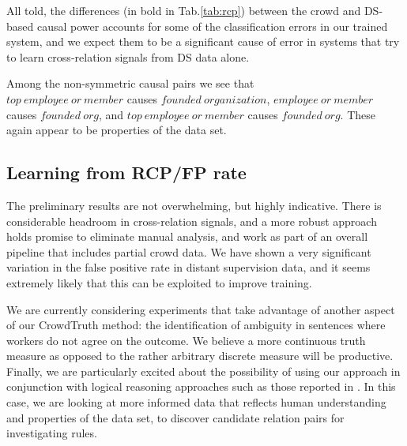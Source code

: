 All told, the differences (in bold in Tab.\ref{tab:rcp}) between the crowd and DS-based causal power accounts for some of the classification errors in our trained system, and we expect them to be a significant cause of error in systems that try to learn cross-relation signals from DS data alone.

Among the non-symmetric causal pairs we see that \\ $top\ employee\ or\ member$ causes $founded\ organization$, $employee\ or\ member$ causes $founded\ org$, and $top\ employee\ or\ member$ causes $founded\ org$.  These again appear to be properties of the data set.


\begin{table}[htb!]
\caption{Precision \& Recall at 20,000 training steps.}
\label{tab:cnn_res}
\centering
{}
\end{table}

\subsection{Learning from RCP/FP rate}

The preliminary results are not overwhelming, but highly indicative.  There is considerable headroom in cross-relation signals, and a more robust approach holds promise to eliminate manual analysis, and work as part of an overall pipeline that includes partial crowd data. We have shown a very significant variation in the false positive rate in distant supervision data, and it seems extremely likely that this can be exploited to improve training.

We are currently considering experiments that take advantage of another aspect of our CrowdTruth method: the identification of ambiguity in sentences where workers do not agree on the outcome.  We believe a more continuous truth measure as opposed to the rather arbitrary discrete measure will be productive. Finally, we are particularly excited about the possibility of using our approach in conjunction with logical reasoning approaches such as those reported in \cite{demeester2016regularizing}.  In this case, we are looking at more informed data that reflects human understanding and properties of the data set, to discover candidate relation pairs for investigating rules.


